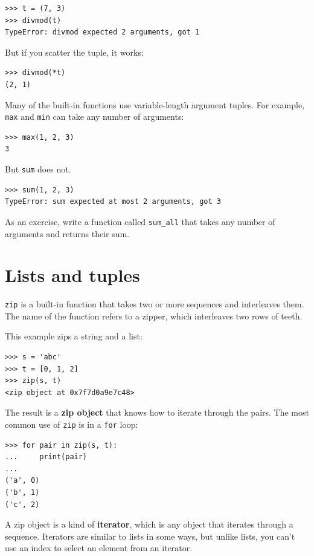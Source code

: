 \documentclass[10pt]{book}
\begin{document}
\begin{verbatim}
>>> t = (7, 3)
>>> divmod(t)
TypeError: divmod expected 2 arguments, got 1
\end{verbatim}
%
But if you scatter the tuple, it works:

\begin{verbatim}
>>> divmod(*t)
(2, 1)
\end{verbatim}
%
Many of the built-in functions use
variable-length argument tuples.  For example, {\tt max}
and {\tt min} can take any number of arguments:

\begin{verbatim}
>>> max(1, 2, 3)
3
\end{verbatim}
%
But {\tt sum} does not.

\begin{verbatim}
>>> sum(1, 2, 3)
TypeError: sum expected at most 2 arguments, got 3
\end{verbatim}
%
As an exercise, write a function called \verb"sum_all" that takes any number
of arguments and returns their sum.


\section{Lists and tuples}

{\tt zip} is a built-in function that takes two or more sequences and
interleaves them.  The name of the function refers to
a zipper, which interleaves two rows of teeth.

This example zips a string and a list:

\begin{verbatim}
>>> s = 'abc'
>>> t = [0, 1, 2]
>>> zip(s, t)
<zip object at 0x7f7d0a9e7c48>
\end{verbatim}
%
The result is a {\bf zip object} that knows how to iterate through
the pairs.  The most common use of {\tt zip} is in a {\tt for} loop:

\begin{verbatim}
>>> for pair in zip(s, t):
...     print(pair)
...
('a', 0)
('b', 1)
('c', 2)
\end{verbatim}
%
A zip object is a kind of {\bf iterator}, which is any object
that iterates through a sequence.  Iterators are similar to lists in some
ways, but unlike lists, you can't use an index to select an element from
an iterator.
\end{document}
